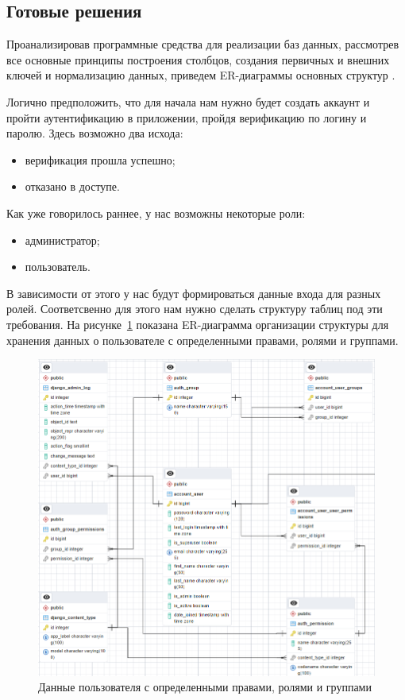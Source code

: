 \subsection{Готовые решения}

Проанализировав программные средства для реализации баз данных, рассмотрев все основные принципы построения столбцов, создания первичных и внешних ключей и нормализацию данных, приведем ER-диаграммы основных структур \cite{book4}.

Логично предположить, что для начала нам нужно будет создать аккаунт и пройти аутентификацию в приложении, пройдя верификацию по логину и паролю. Здесь возможно два исхода:

\begin{itemize}
    \item верификация прошла успешно;
    \item отказано в доступе.
\end{itemize}

Как уже говорилось раннее, у нас возможны некоторые роли:

\begin{itemize}
    \item администратор;
    \item пользователь.
\end{itemize}

В зависимости от этого у нас будут формироваться данные входа для разных ролей. Соответсвенно для этого нам нужно сделать структуру таблиц под эти требования. На рисунке~\ref{fig:fig01} показана ER-диаграмма организации структуры для хранения данных о пользователе с определенными правами, ролями и группами.

\begin{figure}
  \includegraphics[scale=0.733]{inc/django}
  \caption{Данные пользователя с определенными правами, ролями и группами}
  \label{fig:fig01}
\end{figure}

